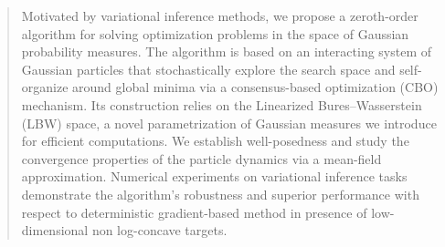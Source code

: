 \documentclass{article}
\theoremstyle{plain}
\theoremstyle{definition}
\theoremstyle{remark}
\newcommand{\rev}{}
\begin{document}
\printAffiliationsAndNotice{}  %






\begin{abstract}
Motivated by variational inference methods, we propose a zeroth-order algorithm for solving optimization problems in the space of Gaussian probability measures. The algorithm is based on an interacting system of Gaussian particles that stochastically explore the search space and self-organize around global minima via a consensus-based optimization (CBO) mechanism. 
Its construction relies on the Linearized Bures–Wasserstein (LBW) space, a novel parametrization of Gaussian measures we introduce for efficient computations. 
We establish well-posedness and study the convergence properties of the particle dynamics via a mean-field approximation. Numerical experiments on variational inference tasks demonstrate the algorithm’s robustness and superior performance with respect to \rev{deterministic} gradient-based method in presence of \rev{low-dimensional} non log-concave targets.
\end{abstract}
\end{document}
